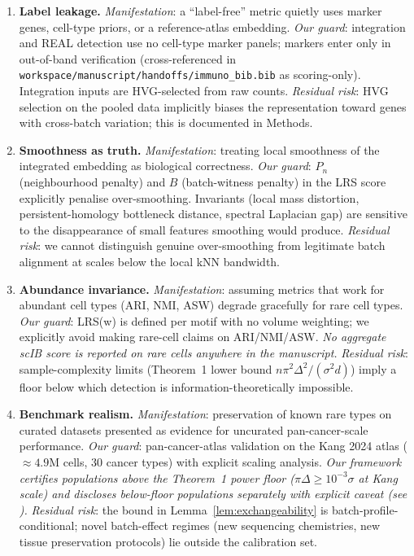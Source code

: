 \begin{enumerate}[label=\textbf{S0.\arabic*}, leftmargin=*]
\label{sec:eightTraps}

\item \textbf{Label leakage.}
  \emph{Manifestation}: a ``label-free'' metric quietly uses marker genes, cell-type priors, or a reference-atlas embedding.
  \emph{Our guard}: integration and REAL detection use no cell-type marker panels; markers enter only in out-of-band verification (cross-referenced in \texttt{workspace/manuscript/handoffs/immuno\_bib.bib} as scoring-only). Integration inputs are HVG-selected from raw counts.
  \emph{Residual risk}: HVG selection on the pooled data implicitly biases the representation toward genes with cross-batch variation; this is documented in Methods.

\item \textbf{Smoothness as truth.}
  \emph{Manifestation}: treating local smoothness of the integrated embedding as biological correctness.
  \emph{Our guard}: $P_n$ (neighbourhood penalty) and $B$ (batch-witness penalty) in the LRS score explicitly penalise over-smoothing. Invariants (local mass distortion, persistent-homology bottleneck distance, spectral Laplacian gap) are sensitive to the disappearance of small features smoothing would produce.
  \emph{Residual risk}: we cannot distinguish genuine over-smoothing from legitimate batch alignment at scales below the local kNN bandwidth.

\item \textbf{Abundance invariance.}
  \emph{Manifestation}: assuming metrics that work for abundant cell types (ARI, NMI, ASW) degrade gracefully for rare cell types.
  \emph{Our guard}: LRS(w) is defined per motif with no volume weighting; we explicitly avoid making rare-cell claims on ARI/NMI/ASW. \emph{No aggregate scIB score is reported on rare cells anywhere in the manuscript.}
  \emph{Residual risk}: sample-complexity limits (Theorem~1 lower bound $n \pi^{2} \Delta^{2} / (\sigma^{2} d)$) imply a floor below which detection is information-theoretically impossible.

\item \textbf{Benchmark realism.}
  \emph{Manifestation}: preservation of known rare types on curated datasets presented as evidence for uncurated pan-cancer-scale performance.
  \emph{Our guard}: pan-cancer-atlas validation on the Kang 2024 atlas ($\approx 4.9$M cells, $30$ cancer types) with explicit scaling analysis. \emph{Our framework certifies populations above the Theorem~1 power floor ($\pi \Delta \geq 10^{-3}\sigma$ at Kang scale) and discloses below-floor populations separately with explicit caveat (see ).}
  \emph{Residual risk}: the bound in Lemma~\ref{lem:exchangeability} is batch-profile-conditional; novel batch-effect regimes (new sequencing chemistries, new tissue preservation protocols) lie outside the calibration set.


\end{enumerate}
